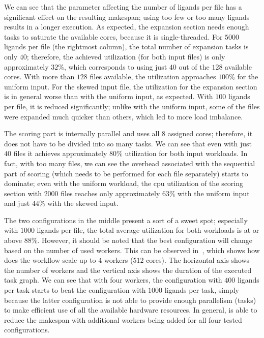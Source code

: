 We can see that the parameter affecting the number of ligands per file has a significant effect on
the resulting makespan; using too few or too many ligands results in a longer execution. As
expected, the expansion section needs enough tasks to saturate the available cores, because it is
single-threaded. For $5000$ ligands per file (the rightmost column), the total
number of expansion tasks is only $40$; therefore, the achieved utilization (for
both input files) is only approximately $32\%$, which corresponds to using just
$40$ out of the $128$ available cores. With more than
$128$ files available, the utilization approaches $100\%$ for the
uniform input. For the skewed input file, the utilization for the expansion section is in general
worse than with the uniform input, as expected. With $100$ ligands per file, it
is reduced significantly; unlike with the uniform input, some of the files were expanded much
quicker than others, which led to more load imbalance.

The scoring part is internally parallel and uses all $8$ assigned cores;
therefore, it does not have to be divided into so many tasks. We can see that even with just
$40$ files it achieves approximately $80\%$ utilization for
both input workloads. In fact, with too many files, we can see the overhead associated with the
sequential part of scoring (which needs to be performed for each file separately) starts to
dominate; even with the uniform workload, the \gls{cpu} utilization of the scoring
section with $2000$ files reaches only approximately $63\%$ with
the uniform input and just $44\%$ with the skewed input.

The two configurations in the middle present a sort of a sweet spot; especially with
$1000$ ligands per file, the total average utilization for both workloads is at or
above $88\%$. However, it should be noted that the best configuration will change
based on the number of used workers. This can be observed in~, which shows
how does the workflow scale up to $4$ workers ($512$ cores).
The horizontal axis shows the number of workers and the vertical axis shows the duration of the
executed task graph. We can see that with four workers, the configuration with
$400$ ligands per task starts to beat the configuration with
$1000$ ligands per task, simply because the latter configuration is not able to
provide enough parallelism (tasks) to make efficient use of all the available hardware resources.
In general, \hyperqueue{} is able to reduce the makespan with additional workers being
added for all four tested configurations.

